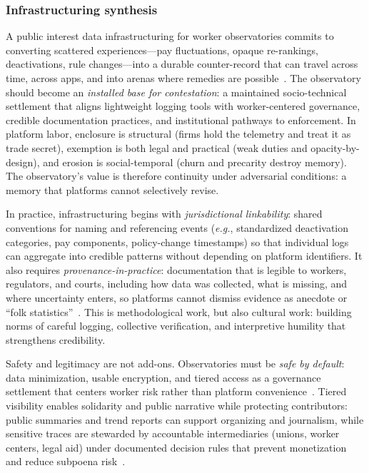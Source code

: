 \documentclass[acmsmall,screen]{acmart}
\begin{document}
\subsubsection*{Infrastructuring synthesis}
A public interest data infrastructuring for worker observatories commits to converting scattered experiences---pay fluctuations, opaque re-rankings, deactivations, rule changes---into a durable counter-record that can travel across time, across apps, and into arenas where remedies are possible~\cite{calacciOrganizingEndEmployment2022,steinYouAreYou2023}. The observatory should become an \emph{installed base for contestation}: a maintained socio-technical settlement that aligns lightweight logging tools with worker-centered governance, credible documentation practices, and institutional pathways to enforcement. In platform labor, enclosure is structural (firms hold the telemetry and treat it as trade secret), exemption is both legal and practical (weak duties and opacity-by-design), and erosion is social-temporal (churn and precarity destroy memory). The observatory's value is therefore continuity under adversarial conditions: a memory that platforms cannot selectively revise.

In practice, infrastructuring begins with \emph{jurisdictional linkability}: shared conventions for naming and referencing events (\textit{e.g.}, standardized deactivation categories, pay components, policy-change timestamps) so that individual logs can aggregate into credible patterns without depending on platform identifiers. It also requires \emph{provenance-in-practice}: documentation that is legible to workers, regulators, and courts, including how data was collected, what is missing, and where uncertainty enters, so platforms cannot dismiss evidence as anecdote or ``folk statistics''~\cite{dalalLessonsWorkersInquiry2024,nagarajraoRideshareTransparencyTranslating2025}. This is methodological work, but also cultural work: building norms of careful logging, collective verification, and interpretive humility that strengthens credibility.

Safety and legitimacy are not add-ons. Observatories must be \emph{safe by default}: data minimization, usable encryption, and tiered access as a governance settlement that centers worker risk rather than platform convenience~\cite{hernandezEndDayAm2024,doDesigningGigWorker2024}. Tiered visibility enables solidarity and public narrative while protecting contributors: public summaries and trend reports can support organizing and journalism, while sensitive traces are stewarded by accountable intermediaries (unions, worker centers, legal aid) under documented decision rules that prevent monetization and reduce subpoena risk~\cite{calacciAccessUnderstandingCollective2023,vincentDataLeverageFramework2021a}.
\end{document}

